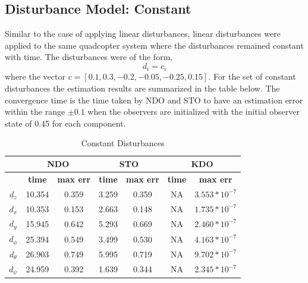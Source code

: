 \documentclass[letterpaper%
, twoside%
, 12pt%
,memoire%
, english%
,creativecommons,hyperref%
]{thETS}
\theoremstyle{newThmStyle}
\begin{document}
\subsection{Disturbance Model: Constant}
Similar to the case of applying linear disturbances, linear disturbances were applied to the same quadcopter system where the disturbances remained constant with time. The disturbances were of the form, 
\begin{equation}
d_i = c_i
\label{eq:dist_4}
\end{equation}
where the vector $c=[0.1,0.3,-0.2,-0.05,-0.25,0.15]$. 
For the set of constant disturbances the estimation results are summarized in the table below. The convergence time is the time taken by NDO and STO to have an estimation error within the range $\pm0.1$ when the observers are initialized with the initial observer state of 0.45 for each component.
\begin{table}[!htbp]
\centering
\caption{Constant Disturbances}
\begin{tabular}{|c|c|c|c|c|c|c|}
\hline
{}  &  \multicolumn{2}{c|}{\textbf{NDO}} & \multicolumn{2}{c|}{\textbf{STO}} & \multicolumn{2}{c|}{\textbf{KDO}}\\
\hline
{}        &  \textbf{time}  & \textbf{max err}  & \textbf{time}  & \textbf{max err}& \textbf{time}  & \textbf{max err}\\
$d_z$     &  10.354 & 0.359   & 3.259  & 0.359 & NA     & $3.553*10^{-7}$\\
$d_x$     &  10.353 & 0.153   & 2.663  & 0.148 & NA     & $1.735*10^{-7}$\\
$d_y$     &  15.945 & 0.642   & 5.293  & 0.669 & NA     & $2.460*10^{-7}$\\
$d_\phi$  &  25.394 & 0.549   & 3.499  & 0.530 & NA     & $4.163*10^{-7}$\\
$d_\theta$&  26.903 & 0.749   & 5.995  & 0.719 & NA     & $9.702*10^{-7}$\\
$d_\psi$  &  24.959 & 0.392   & 1.639  & 0.344 & NA     & $2.345*10^{-7}$\\
\hline
\end{tabular}
\end{table}
\end{document}

